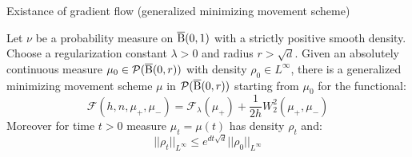 Existance of gradient flow (generalized minimizing movement scheme)
\begin{thm} \label{thm:existance_gmm_scheme}
Let $\nu$ be a probability measure on $\operatorname{\overline{B}}(0,1)$ with a strictly positive smooth density. Choose a regularization constant $\lambda > 0$ and radius $r > \sqrt{d}$. Given an absolutely continuous measure $\mu_0 \in \mathcal{P}(\operatorname{\overline{B}}(0,r))$ with density $\rho_0 \in L^{\infty}$, there is a generalized minimizing movement scheme $\mu$ in $\mathcal{P}(\operatorname{\overline{B}}(0,r))$ starting from $\mu_0$ for the functional:
\begin{equation} \label{gmm:sw_ent_functional}
\mathcal{F}(h, n , \mu_+, \mu_-) = \mathcal{F}_{\lambda}(\mu_+) + \frac{1}{2h}W_2^2(\mu_+, \mu_-)
\end{equation}
Moreover for time $t > 0$ measure $\mu_t = \mu(t)$ has density $\rho_t$ and:
\[
||\rho_t||_{L^{\infty}} \leq e^{d t\sqrt{d}} ||\rho_0||_{L^{\infty}}
\]
\end{thm}
